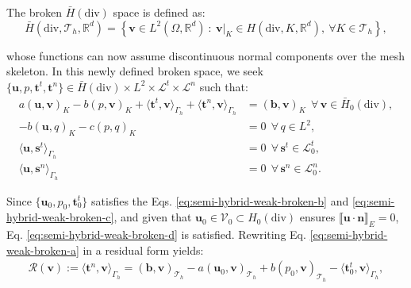 \documentclass[english,11pt,3p,number,sort&compress]{elsarticle}
\newcommand{\jump}[1]
{
	\llbracket #1 \rrbracket
}
\begin{document}
The broken $\bar{H}(\text{div})$ space is defined as:
\begin{equation}
	\label{eq:brokenspace-div}
	\bar{H}(\text{div},\mathcal{T}_h,\mathbb{R}^d) = \left\{\bm{v} \in L^2(\Omega,\mathbb{R}^d) ~:~ \bm{v}\lvert_K \in H(\text{div},K,\mathbb{R}^d), ~\forall K \in \mathcal{T}_h\right\},
\end{equation}

\noindent whose functions can now assume discontinuous normal components over the mesh skeleton. In this newly defined broken space, we seek $\{\bm{u},p,\bm{t}^t,\bm{t}^n\} \in \bar{H}(\text{div}) \times L^2 \times \mathcal{L}^t \times \mathcal{L}^n$ such that:
\begin{subequations} \label{eq:semi-hybrid-weak-broken}
	\begin{align}
		a\left(\bm{u},\bm{v}\right)_{K} - b\left( p, \bm{v}\right)_{K} + \langle\bm{t}^t,\bm{v}\rangle_{\Gamma_h} + \langle\bm{t}^n,\bm{v}\rangle_{\Gamma_h} &= \left(\bm{b},\bm{v}\right)_{K} ~~\forall\, \bm{v} \in \bar{H}_0(\text{div}),\label{eq:semi-hybrid-weak-broken-a}\\ 
		-b\left(\bm{u}, q\right)_{K} - c\left(p,q \right)_{K} &= 0 ~~\forall\, q \in L^2, \label{eq:semi-hybrid-weak-broken-b}\\
		\langle\bm{u},\bm{s}^t\rangle_{\Gamma_h} &= 0 ~~\forall\, \bm{s}^t \in \mathcal{L}^t_0, \label{eq:semi-hybrid-weak-broken-c}\\
		\langle\bm{u},\bm{s}^n\rangle_{\Gamma_h} &= 0 ~~\forall\, \bm{s}^n \in \mathcal{L}^n_0 . \label{eq:semi-hybrid-weak-broken-d}
	\end{align}
\end{subequations}

Since $\{\bm{u}_0,p_0,\bm{t}^t_0\}$ satisfies the Eqs. \eqref{eq:semi-hybrid-weak-broken-b} and \eqref{eq:semi-hybrid-weak-broken-c}, and given that $\bm{u}_0 \in \mathcal{V}_0 \subset H_0(\text{div})$ ensures $\jump{\bm{u}\cdot\bm{n}}_E=0$, Eq. \eqref{eq:semi-hybrid-weak-broken-d} is satisfied. Rewriting Eq. \eqref{eq:semi-hybrid-weak-broken-a} in a residual form yields:
\begin{equation} \label{eq:semi-hybrid-residual}
	\begin{aligned}
		\mathcal{R}(\bm{v}) := \langle\bm{t}^n,\bm{v}\rangle_{\Gamma_h} = \left(\bm{b},\bm{v}\right)_{\mathcal{T}_h} -a\left(\bm{u}_0,\bm{v}\right)_{\mathcal{T}_h} + b\left( p_0, \bm{v}\right)_{\mathcal{T}_h} - \langle\bm{t}^t_0,\bm{v}\rangle_{\Gamma_h},
	\end{aligned}
\end{equation}
\end{document}
